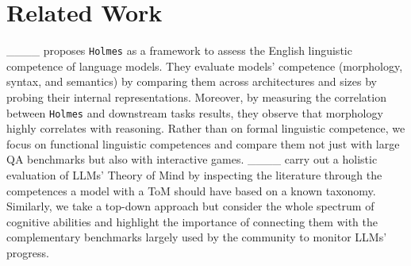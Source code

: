 \section{Related Work}
\label{sec:related}

 ____ proposes {\tt Holmes} as a framework to assess the English linguistic competence of language models. They evaluate models' competence (morphology, syntax, and semantics) by comparing them across architectures and sizes by probing their internal representations. %
Moreover, by measuring the correlation between {\tt Holmes} and downstream tasks results, they observe that morphology highly correlates with reasoning. Rather than on formal linguistic competence, we focus on functional linguistic competences and compare them not just with large QA benchmarks but also with interactive games.
____ carry out a holistic evaluation of LLMs' Theory of Mind by inspecting the literature through the competences a model with a ToM should have based on a known taxonomy. 
Similarly, we take a top-down approach but consider the whole spectrum of cognitive abilities and highlight the importance of connecting them with the complementary benchmarks largely used by the community to monitor LLMs' progress.





